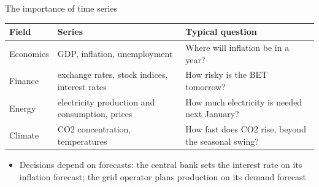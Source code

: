 \begin{frame}{The importance of time series}
\itemsize{\footnotesize}
\begin{center}
\footnotesize
\begin{tabular}{>{\raggedright\arraybackslash}p{1.9cm}>{\raggedright\arraybackslash}p{4.3cm}>{\raggedright\arraybackslash}p{6.2cm}}
\toprule
\textbf{Field} & \textbf{Series} & \textbf{Typical question} \\
\midrule
Economics & GDP, inflation, unemployment & Where will inflation be in a year? \\
Finance & exchange rates, stock indices, interest rates & How risky is the BET tomorrow? \\
Energy & electricity production and consumption, prices & How much electricity is needed next January? \\
Climate & CO2 concentration, temperatures & How fast does CO2 rise, beyond the seasonal swing? \\
\bottomrule
\end{tabular}
\end{center}
\begin{itemize}
    \item Decisions depend on forecasts: the central bank sets the interest rate on its inflation forecast; the grid operator plans production on its demand forecast
\end{itemize}
\end{frame}

